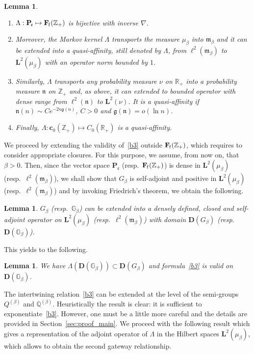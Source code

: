 \documentclass[10pt]{amsart}
\newtheorem{lemm}[theo]{Lemma}\newtheorem{prop}[theo]{Proposition}\newtheorem{coro}[theo]{Corollary}\newtheorem{conj}[theo]{Conjecture}
\theoremstyle{definition}\newtheorem{defi}[theo]{Definition}\newtheorem{rema}[theo]{Remark}\newtheorem{exam}[theo]{Example}\newtheorem{exem}[theo]{Example}\newtheorem{nota}[theo]{Notation}
\newcommand{\RR}{\mathbb{R}}
\newcommand{\ZZ}{\mathbb{Z}}
\newcommand{\fe}{\mathfrak{e}}
\newcommand{\fm}{\mathfrak{m}}
\newcommand{\na}{\nabla}
\newcommand{\dBg}{{\discret{G}}}
\newcommand{\Bg}{G}
\newcommand{\dBs}{{\discret{Q}}}
\newcommand{\Bs}{Q}
\newcommand{\esP}{\mathbf{P}}
\newcommand{\esD}{\mathbf{D}}
\newcommand{\esL}{\mathbf{L}}
\newcommand{\esLd}{\ell}
\newcommand{\esF}{\mathbf{F}}
\newcommand{\esc}{\mathbf{c}}
\newcommand{\esPe}{\esP_{\! \fe}}
\newcommand{\esFf}{\esF_{\hskip-.3mm\mathrm{f}}}
\newcommand{\Cp}{{C_{0}(\RR_{+})}}
\newcommand{\discret}[1]{\mathds{#1}}
\providecommand{\pointir}{.\enspace---\enspace}
\newenvironment{lemmc}{\let\pointir\relax \begin{lemm}}{\end{lemm}}
\begin{document}
\begin{lemmc}\label{lem:lambda_def}\ 
\begin{enumerate}%
\item $\Lambda : \esPe \mapsto \esFf(\ZZ_+)$ is bijective with inverse $\na$.
\item Moreover, the Markov kernel $\Lambda$ transports the measure $\mu_{\beta}$ into $\fm_{\beta}$ and it can be extended into a quasi-affinity, still denoted by $\Lambda$, from $\esLd^2(\fm_{\beta})$ to $\esL^2(\mu_{\beta})$ with an operator norm bounded by $1$.
\item Similarly, $\Lambda$ transports any probability measure $\nu$ on $\RR_+$ into a probability measure $\mathfrak{n}$ on $\ZZ_+$ and, as above, it can extended to bounded operator with dense range from $\esLd^2(\mathfrak{n})$ to $\esL^2(\nu)$. It is a quasi-affinity if $\mathfrak{n}(n)\sim C e^{-2 n \mathfrak{g}(n)}$, $C>0$ and $\mathfrak{g(n)}=o(\ln n)$.
\item Finally, $\Lambda : \esc_0(\ZZ_+) \mapsto \Cp$ is a quasi-affinity.
\end{enumerate}
\end{lemmc}

We proceed by extending the validity of~\eqref{b3} outside $\esFf(\ZZ_+)$, which requires to consider appropriate closures. For this purpose, we assume, from now on, that $\beta>0$. Then, since the vector space $\esPe$ (resp.~$\esFf(\ZZ_+)$) is dense in $\esL^2(\mu_{\beta})$ (resp.~$\esLd^2(\fm_{\beta})$), we shall show that $\Bg_{\beta}$ is self-adjoint and positive in $\esL^2(\mu_{\beta})$ (resp.~$\esLd^2(\fm_{\beta})$) and by invoking Friedrich's theorem, we obtain the following.

\begin{lemm}\label{lem:G_L2}
$\Bg_{\beta}$ (resp.~$\dBg_{\beta}$) can be extended into a densely defined, closed and self-adjoint operator on $\esL^2(\mu_{\beta})$ (resp.~$\esLd^2(\fm_{\beta})$) with domain $\esD(\Bg_{\beta})$ (resp.~$\esD(\dBg_{\beta})$).
\end{lemm}

This yields to the following.

\begin{lemm} \label{lem:lambda_range}
We have $\Lambda(\esD(\dBg_{\beta}))\subset \esD(\Bg_{\beta})$ and formula~\eqref{b3} is valid on $\esD(\dBg_{\beta})$.
\end{lemm}

The intertwining relation~\eqref{b3} can be extended at the level of the semi-groups $\Bs^{(\beta)}$ and $\dBs^{(\beta)}$. Heuristically the result is clear: it is sufficient to exponentiate~\eqref{b3}. However, one must be a little more careful and the details are provided in Section~\ref{sec:proof_main}. We proceed with the following result which gives a representation of the adjoint operator of $\Lambda$ in the Hilbert spaces $\esL^2(\mu_{\beta})$, which allows to obtain the second gateway relationship.
\end{document}
